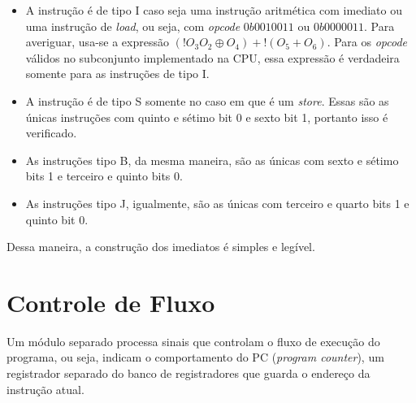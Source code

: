 \documentclass[twocolumn]{article}
\newcommand{\circuit}[1]{}
\begin{document}
\begin{itemize}
\item A instrução é de tipo I caso seja uma instrução aritmética com imediato ou
  uma instrução de \textit{load}, ou seja, com \textit{opcode} $0b0010011$ ou
  $0b0000011$. Para averiguar, usa-se a expressão
  $(!O_3 O_2 \oplus  O_4) + !(O_5 + O_6)$.
  Para os \textit{opcode} válidos no subconjunto implementado na CPU, essa
  expressão é verdadeira somente para as instruções de tipo I.
\item A instrução é de tipo S somente no caso em que é um \textit{store}. Essas
  são as únicas instruções com quinto e sétimo bit 0 e sexto bit 1, portanto
  isso é verificado.
\item As instruções tipo B, da mesma maneira, são as únicas com sexto e sétimo
  bits 1 e terceiro e quinto bits 0.
\item As instruções tipo J, igualmente, são as únicas com terceiro e quarto bits
  1 e quinto bit 0.
\end{itemize}

Dessa maneira, a construção dos imediatos é simples e legível.

\section{Controle de Fluxo}

Um módulo separado processa sinais que controlam o fluxo de execução do
programa, ou seja, indicam o comportamento do PC (\textit{program counter}), um
registrador separado do banco de registradores que guarda o endereço da
instrução atual.

\circuit{pc-signal}

{}

\end{document}
